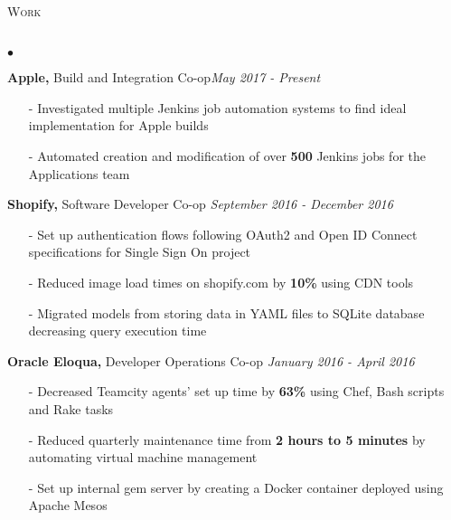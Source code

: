 \documentclass[11pt]{article}
\newcommand{\lineunder}{\vspace*{-8pt} \\ \hspace*{-18pt} \hrulefill \\}
\newcommand{\header}[1]{{\hspace*{-15pt}\vspace*{6pt} \textsc{#1}} \vspace*{-6pt} \lineunder }
\newenvironment{achievements}{\begin{list}{$\bullet$}{\topsep 0pt \itemsep -1.5pt \leftmargin 5pt}}{\vspace*{4pt}\end{list}}
\begin{document}
\header{\fontsize{12.2}{10}\selectfont Work}
\begin{achievements}

\item \textbf{Apple,} Build and Integration Co-op\hfill \textit {May 2017 - Present}
\vspace{2pt}
\begin{itemize}
\item[-] Investigated multiple Jenkins job automation systems to find ideal implementation for Apple builds
\vspace{2pt}
    \item[-] Automated creation and modification of over \textbf{500} Jenkins jobs for the Applications team
\end{itemize}

\vspace{7pt}

\item \textbf{Shopify,} Software Developer Co-op \hfill \textit {September 2016 - December 2016}
\vspace{2pt}
\begin{itemize}

\item[-] Set up authentication flows following OAuth2 and Open ID Connect specifications for Single Sign On project
\vspace{2pt}
\item[-] Reduced image load times on shopify.com by \textbf{10\%} using CDN tools
\vspace{2pt}
\item[-] Migrated models from storing data in YAML files to SQLite database decreasing query execution time

\end{itemize}

\vspace{7pt}

\item \textbf{Oracle Eloqua,} Developer Operations Co-op \hfill \textit {January 2016 - April 2016}
\vspace{2pt}
\begin{itemize}
\item[-] Decreased Teamcity agents' set up time by \textbf{63\%} using Chef, Bash scripts and Rake tasks
\vspace{2pt}
\item[-] Reduced quarterly maintenance time from \textbf{2 hours to 5 minutes} by automating virtual machine management
\vspace{2pt}
\item[-]Set up internal gem server by creating a Docker container deployed using Apache Mesos
\end{itemize}


\end{achievements}
\end{document}
